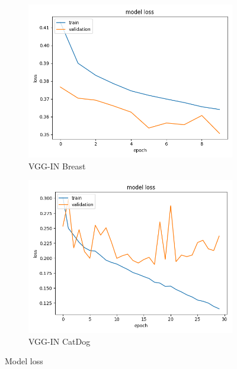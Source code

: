 \begin{figure}[h]
\begin{subfigure}[b]{.45\linewidth}
\includegraphics[width=\linewidth]{Figs/vgg_in_breast_loss.jpg}
\caption{VGG-IN Breast}
\end{subfigure}
\begin{subfigure}[b]{.45\linewidth}
\includegraphics[width=\linewidth]{Figs/vgg_in_catdog_loss.jpg}
\caption{VGG-IN CatDog}
\end{subfigure}

\caption{Model loss}
\label{fig:loss2}
\end{figure}

